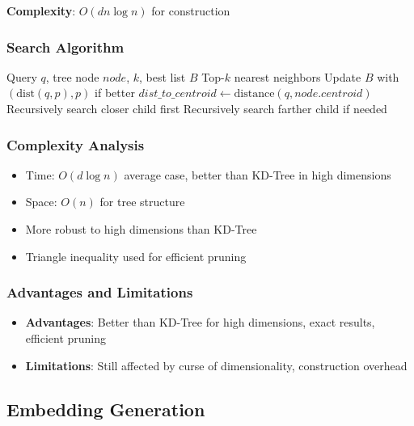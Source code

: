 \documentclass[12pt,a4paper]{article}
\begin{document}
\textbf{Complexity}: $O(dn \log n)$ for construction

\subsubsection{Search Algorithm}
\begin{algorithm}
\caption{Ball Tree k-NN Search}
\begin{algorithmic}[1]
\Require Query $q$, tree node $node$, $k$, best list $B$
\Ensure Top-$k$ nearest neighbors
        \State Update $B$ with $(\text{dist}(q, p), p)$ if better
    \EndFor
    \State \Return
\EndIf
\State $dist\_to\_centroid \gets \text{distance}(q, node.centroid)$
    \State \Return {}
\EndIf
\State Recursively search closer child first
\State Recursively search farther child if needed
\end{algorithmic}
\end{algorithm}

\subsubsection{Complexity Analysis}
\begin{itemize}
    \item Time: $O(d \log n)$ average case, better than KD-Tree in high dimensions
    \item Space: $O(n)$ for tree structure
    \item More robust to high dimensions than KD-Tree
    \item Triangle inequality used for efficient pruning
\end{itemize}

\subsubsection{Advantages and Limitations}
\begin{itemize}
    \item \textbf{Advantages}: Better than KD-Tree for high dimensions, exact results, efficient pruning
    \item \textbf{Limitations}: Still affected by curse of dimensionality, construction overhead
\end{itemize}

\subsection{Embedding Generation}
\end{document}
